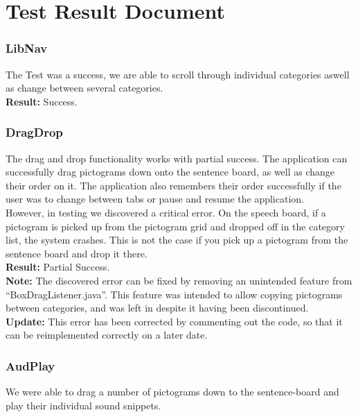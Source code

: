 \section{Test Result Document}

\subsubsection*{LibNav}
The Test was a success, we are able to scroll through individual categories aswell as change between several categories.\\

\textbf{Result:} Success.

\subsubsection*{DragDrop}
The drag and drop functionality works with partial success.
The application can successfully drag pictograms down onto the sentence board, as well as change their order on it.
The application also remembers their order successfully if the user was to change between tabs or pause and resume the application.\\

However, in testing we discovered a critical error. On the speech board, if a pictogram is picked up from the pictogram grid and dropped off in the category list, the system crashes.
This is not the case if you pick up a pictogram from the sentence board and drop it there.\\

\textbf{Result: }Partial Success.\\

\textbf{Note:} The discovered error can be fixed by removing an unintended feature from ``BoxDragListener.java''. This feature was intended to allow copying pictograms between categories, and was left in despite it having been discontinued. \\

\textbf{Update:} This error has been corrected by commenting out the code, so that it can be reimplemented correctly on a later date.

\subsubsection*{AudPlay}
We were able to drag a number of pictograms down to the sentence-board and play their individual sound snippets.\\

